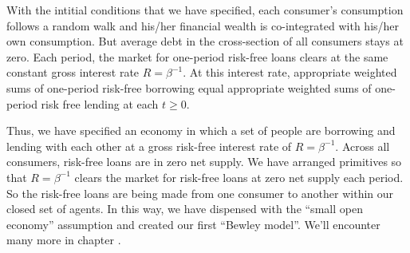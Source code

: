 With the intitial conditions that we have specified, each consumer's consumption follows a random walk and his/her financial wealth is co-integrated with his/her own consumption. But average debt in the cross-section of all consumers stays at zero.   Each period, the market for one-period risk-free loans clears at the same 
constant gross interest rate $R = \beta^{-1}$. At this interest rate,  appropriate weighted sums of one-period risk-free borrowing equal  appropriate weighted sums of one-period risk free lending at each $t \geq 0$. 


Thus, we have specified  an economy in which a  set of people are borrowing and lending
with each other at a gross risk-free interest rate of
$R = \beta^{-1}$.
Across all consumers, risk-free loans are in zero net supply.
We have arranged primitives so that $R = \beta^{-1}$ clears the market for risk-free loans at zero net supply each period. 
So the risk-free loans are being made from one consumer to another within our closed set of agents.
In this way, we have dispensed with the ``small open economy'' assumption and created our 
first ``Bewley model''.  We'll encounter many more in chapter .



